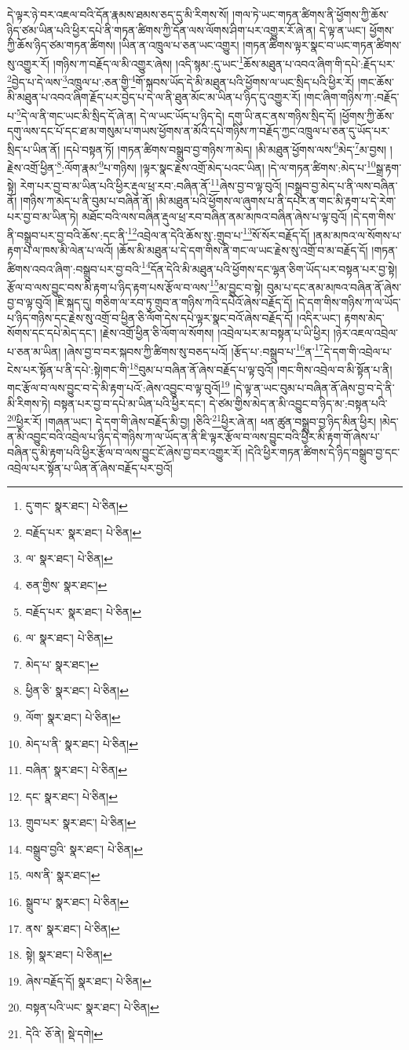 དེ་ལྟར་ཉེ་བར་འཇལ་བའི་དོན་རྣམས་ཐམས་ཅད་དུ་མི་རིགས་སོ། །གལ་ཏེ་ཡང་གཏན་ཚིགས་ནི་ཕྱོགས་ཀྱི་ཆོས་ཉིད་ཙམ་ཡིན་པའི་ཕྱིར་དཔེ་ནི་གཏན་ཚིགས་ཀྱི་དོན་ལས་ལོགས་ཤིག་པར་འགྱུར་རོ་ཞེ་ན། དེ་ལྟ་ན་ཡང་། ཕྱོགས་ཀྱི་ཆོས་ཉིད་ཙམ་གཏན་ཚིགས། །ཡིན་ན་འཁྲུལ་པ་ཅན་ཡང་འགྱུར། །གཏན་ཚིགས་ལྟར་སྣང་བ་ཡང་གཏན་ཚིགས་སུ་འགྱུར་རོ། །གཉིས་ཀ་བརྗོད་ལ་མི་འགྱུར་ཞེས། །འདི་སྙམ་:དུ་ཡང་\footnote{དུ་གང་  སྣར་ཐང་།  པེ་ཅིན། }ཆོས་མཐུན་པ་འབའ་ཞིག་གི་དཔེ་:རྗོད་པར་\footnote{བརྗོད་པར་  སྣར་ཐང་།  པེ་ཅིན། }བྱེད་པ་དེ་ལས་\footnote{ལ་  སྣར་ཐང་།  པེ་ཅིན། }འཁྲུལ་པ་:ཅན་གྱི་\footnote{ཅན་གྱིས་  སྣར་ཐང་། }གོ་སྐབས་ཡོད་དེ་མི་མཐུན་པའི་ཕྱོགས་ལ་ཡང་སྲིད་པའི་ཕྱིར་རོ། །གང་ཆོས་མི་མཐུན་པ་འབའ་ཞིག་རྗོད་པར་བྱེད་པ་དེ་ལ་ནི་ཐུན་མོང་མ་ཡིན་པ་ཉིད་དུ་འགྱུར་རོ། །གང་ཞིག་གཉིས་ཀ་:བརྗོད་པ་\footnote{བརྗོད་པར་  སྣར་ཐང་།  པེ་ཅིན། }དེ་ལ་ནི་གང་ཡང་མི་སྲིད་དོ་ཞེ་ན། དེ་ལ་ཡང་ཡོད་པ་ཉིད་དེ། དགུ་ཡི་ནང་ནས་གཉིས་སྲིད་དོ། །ཕྱོགས་ཀྱི་ཆོས་དགུ་ལས་དང་པོ་དང་ཐ་མ་གསུམ་པ་གཡས་ཕྱོགས་ན་མོའི་དཔེ་གཉིས་ཀ་བརྗོད་ཀྱང་འཁྲུལ་པ་ཅན་དུ་ཡོད་པར་སྲིད་པ་ཡིན་ནོ། །དཔེ་བསྟན་ཏོ། །གཏན་ཚིགས་བསྒྲུབ་བྱ་གཉིས་ཀ་མེད། །མི་མཐུན་ཕྱོགས་ལས་\footnote{ལ་  སྣར་ཐང་།  པེ་ཅིན། }མེད་\footnote{མེད་པ་  སྣར་ཐང་། }མ་བྱས། །རྗེས་འགྲོ་ཕྱིན་\footnote{ཕྱིན་ཅི་  སྣར་ཐང་།  པེ་ཅིན། }:ལོག་རྣམ་\footnote{ལོག་  སྣར་ཐང་།  པེ་ཅིན། }པ་གཉིས། །ལྟར་སྣང་རྗེས་འགྲོ་མེད་པའང་ཡིན། །དེ་ལ་གཏན་ཚིགས་:མེད་པ་\footnote{མེད་པ་ནི་  སྣར་ཐང་།  པེ་ཅིན། }སྒྲ་རྟག་སྟེ། རེག་པར་བྱ་བ་མ་ཡིན་པའི་ཕྱིར་རྡུལ་ཕྲ་རབ་:བཞིན་ནོ་\footnote{བཞིན་  སྣར་ཐང་།  པེ་ཅིན། }ཞེས་བྱ་བ་ལྟ་བུའོ། །བསྒྲུབ་བྱ་མེད་པ་ནི་ལས་བཞིན་ནོ། །གཉིས་ཀ་མེད་པ་ནི་བུམ་པ་བཞིན་ནོ། །མི་མཐུན་པའི་ཕྱོགས་ལ་ཞུགས་པ་ནི་དཔེར་ན་གང་མི་རྟག་པ་དེ་རེག་པར་བྱ་བ་མ་ཡིན་ཏེ། མཐོང་བའི་ལས་བཞིན་རྡུལ་ཕྲ་རབ་བཞིན་ནམ་མཁའ་བཞིན་ཞེས་པ་ལྟ་བུའོ། །དེ་དག་གིས་ནི་བསྒྲུབ་པར་བྱ་བའི་ཆོས་:དང་ནི་\footnote{དང་  སྣར་ཐང་།  པེ་ཅིན། }འབྲེལ་ན་དེའི་ཆོས་སུ་:གྲུབ་པ་\footnote{གྲུབ་པར་  སྣར་ཐང་།  པེ་ཅིན། }སོ་སོར་བརྗོད་དོ། །ནམ་མཁའ་ལ་སོགས་པ་རྟག་པ་ལ་ཁས་མི་ལེན་པ་ལའོ། །ཆོས་མི་མཐུན་པ་དེ་དག་གིས་ནི་གང་ལ་ཡང་རྗེས་སུ་འགྲོ་བ་མ་བརྗོད་དོ། །གཏན་ཚིགས་འབའ་ཞིག་:བསྒྲུབ་པར་བྱ་བའི་\footnote{བསྒྲུབ་བྱའི་  སྣར་ཐང་།  པེ་ཅིན། }དོན་དེའི་མི་མཐུན་པའི་ཕྱོགས་དང་ལྷན་ཅིག་ཡོད་པར་བསྟན་པར་བྱ་སྟེ། རྩོལ་བ་ལས་བྱུང་བས་མི་རྟག་པ་ཉིད་རྟག་པས་རྩོལ་བ་ལས་\footnote{ལས་ནི་  སྣར་ཐང་། }མ་བྱུང་བ་སྟེ། བུམ་པ་དང་ནམ་མཁའ་བཞིན་ནོ་ཞེས་བྱ་བ་ལྟ་བུའོ། །ཇི་སྐད་དུ། གཅིག་ལ་རབ་ཏུ་གྲུབ་ན་གཉིས་ཀའི་དཔེའོ་ཞེས་བརྗོད་དོ། །དེ་དག་གིས་གཉིས་ཀ་ལ་ཡོད་པ་ཉིད་གཉིས་དང་རྗེས་སུ་འགྲོ་བ་ཕྱིན་ཅི་ལོག་དེས་དཔེ་ལྟར་སྣང་བའོ་ཞེས་བརྗོད་དོ། །འདིར་ཡང་། རྟགས་མེད་སོགས་དང་དཔེ་མེད་དང་། །རྗེས་འགྲོ་ཕྱིན་ཅི་ལོག་ལ་སོགས། །འབྲེལ་པར་མ་བསྟན་པ་ཡི་ཕྱིར། །ཉེར་འཇལ་འབྲེལ་པ་ཅན་མ་ཡིན། །ཞེས་བྱ་བ་བར་སྐབས་ཀྱི་ཚིགས་སུ་བཅད་པའོ། །རྩོད་པ་:བསྒྲུབ་པ་\footnote{སྒྲུབ་པ་  སྣར་ཐང་།  པེ་ཅིན། }ན་\footnote{ནས་  སྣར་ཐང་།  པེ་ཅིན། }དེ་དག་གི་འབྲེལ་པ་ངེས་པར་སྟོན་པ་ནི་དཔེ་:སྟེ།གང་གི་\footnote{སྟེ།  སྣར་ཐང་།  པེ་ཅིན། }བུམ་པ་བཞིན་ནོ་ཞེས་བརྗོད་པ་ལྟ་བུའོ། །གང་གིས་འབྲེལ་བ་མི་སྟོན་པ་ནི། གང་རྩོལ་བ་ལས་བྱུང་བ་དེ་མི་རྟག་པའོ་:ཞེས་འབྱུང་བ་ལྟ་བུའོ།\footnote{ཞེས་བརྗོད་དོ།  སྣར་ཐང་།  པེ་ཅིན། } །དེ་ལྟ་ན་ཡང་བུམ་པ་བཞིན་ནོ་ཞེས་བྱ་བ་དེ་ནི་མི་རིགས་ཏེ། བསྟན་པར་བྱ་བ་དཔེ་མ་ཡིན་པའི་ཕྱིར་དང་། དེ་ཙམ་གྱིས་མེད་ན་མི་འབྱུང་བ་ཉིད་མ་:བསྟན་པའི་\footnote{བསྟན་པའི་ཡང་  སྣར་ཐང་།  པེ་ཅིན། }ཕྱིར་རོ། །གཞན་ཡང་། དེ་དག་གི་ཞེས་བརྗོད་མི་བྱ། །ཅིའི་\footnote{དེའི་  ཅོ་ནེ།  སྡེ་དགེ། }ཕྱིར་ཞེ་ན། ཕན་ཚུན་བསྒྲུབ་བྱ་ཉིད་མིན་ཕྱིར། །མེད་ན་མི་འབྱུང་བའི་འབྲེལ་པ་ཉིད་དེ་གཉིས་ཀ་ལ་ཡོད་ན་ནི་ཇི་ལྟར་རྩོལ་བ་ལས་བྱུང་བའི་ཕྱིར་མི་རྟག་གོ་ཞེས་པ་བཞིན་དུ་མི་རྟག་པའི་ཕྱིར་རྩོལ་བ་ལས་བྱུང་ངོ་ཞེས་བྱ་བར་འགྱུར་རོ། །དེའི་ཕྱིར་གཏན་ཚིགས་དེ་ཉིད་བསྒྲུབ་བྱ་དང་འབྲེལ་པར་སྟོན་པ་ཡིན་ནོ་ཞེས་བརྗོད་པར་བྱའོ། 